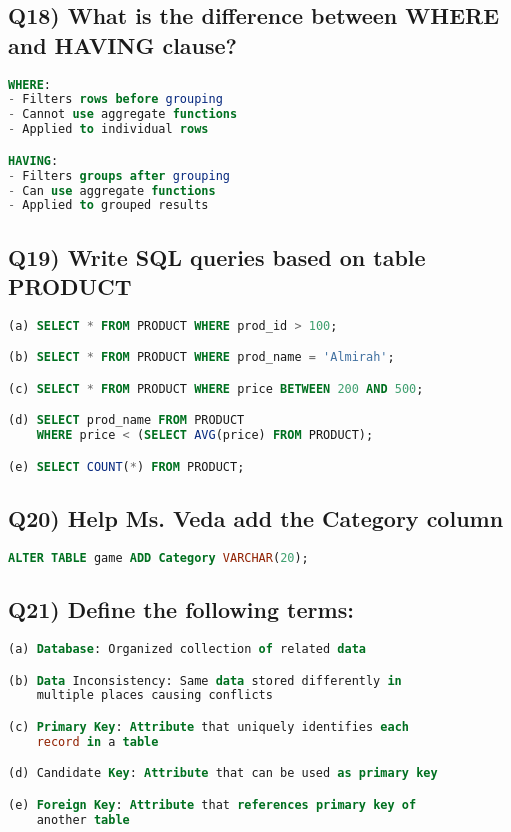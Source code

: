 \documentclass{article}
\begin{document}
\subsection*{Q18) What is the difference between WHERE and HAVING clause?}
\begin{lstlisting}[language=SQL]
WHERE:
- Filters rows before grouping
- Cannot use aggregate functions
- Applied to individual rows

HAVING:
- Filters groups after grouping
- Can use aggregate functions
- Applied to grouped results
\end{lstlisting}

\subsection*{Q19) Write SQL queries based on table PRODUCT}
\begin{lstlisting}[language=SQL]
(a) SELECT * FROM PRODUCT WHERE prod_id > 100;

(b) SELECT * FROM PRODUCT WHERE prod_name = 'Almirah';

(c) SELECT * FROM PRODUCT WHERE price BETWEEN 200 AND 500;

(d) SELECT prod_name FROM PRODUCT 
    WHERE price < (SELECT AVG(price) FROM PRODUCT);

(e) SELECT COUNT(*) FROM PRODUCT;
\end{lstlisting}

\subsection*{Q20) Help Ms. Veda add the Category column}
\begin{lstlisting}[language=SQL]
ALTER TABLE game ADD Category VARCHAR(20);
\end{lstlisting}

\subsection*{Q21) Define the following terms:}
\begin{lstlisting}[language=SQL]
(a) Database: Organized collection of related data

(b) Data Inconsistency: Same data stored differently in 
    multiple places causing conflicts

(c) Primary Key: Attribute that uniquely identifies each 
    record in a table

(d) Candidate Key: Attribute that can be used as primary key

(e) Foreign Key: Attribute that references primary key of 
    another table
\end{lstlisting}
\end{document}
